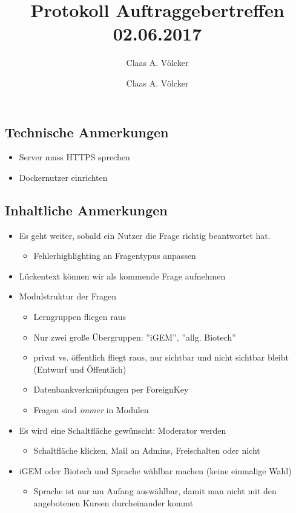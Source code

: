 \documentclass[colorback, accentcolor=tud1c, paper=a4]{tudexercise}
\title{Protokoll Auftraggebertreffen 02.06.2017}
\subtitle{Claas A. Völcker}
\author{Claas A. Völcker}
\begin{document}
	
\maketitle

\begin{multicols}{2}
\subsection*{Technische Anmerkungen}
\begin{itemize}
	\item Server muss HTTPS sprechen
	\item Dockernutzer einrichten
\end{itemize}
\subsection*{Inhaltliche Anmerkungen}
\begin{itemize}
	\item Es geht weiter, sobald ein Nutzer die Frage richtig beantwortet hat.
	\begin{itemize}
		\item Fehlerhighlighting an Fragentypus anpassen
	\end{itemize}
	\item Lückentext können wir als kommende Frage aufnehmen
	\item Modulstruktur der Fragen
	\begin{itemize}
		\item Lerngruppen fliegen raus
		\item Nur zwei große Übergruppen: ''iGEM'', ''allg. Biotech''
		\item privat vs. öffentlich fliegt raus, nur sichtbar und nicht sichtbar bleibt (Entwurf und Öffentlich)
		\item Datenbankverknüpfungen per ForeignKey
		\item Fragen sind \emph{immer} in Modulen
	\end{itemize}
	\item Es wird eine Schaltfläche gewünscht: Moderator werden
	\begin{itemize}
		\item Schaltfläche klicken, Mail an Admins, Freischalten oder nicht
	\end{itemize}
	\item iGEM oder Biotech und Sprache wählbar machen (keine einmalige Wahl)
	\begin{itemize}
		\item Sprache ist nur am Anfang auswählbar, damit man nicht mit den angebotenen Kursen durcheinander kommt

\end{itemize}
\end{itemize}
\end{multicols}
\end{document}
